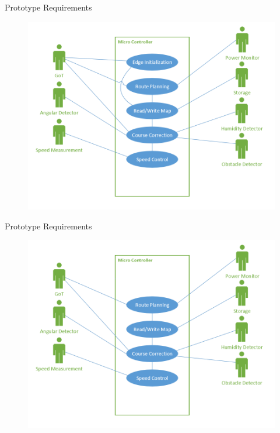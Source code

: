 \begin{frame}{Prototype Requirements}
\begin{figure}
\includegraphics[width=\textwidth]{Pictures/uc3.png}
\end{figure}
\end{frame}
\begin{frame}{Prototype Requirements}
\begin{figure}
\includegraphics[width=\textwidth]{Pictures/uc4.png}
\end{figure}
\end{frame}
